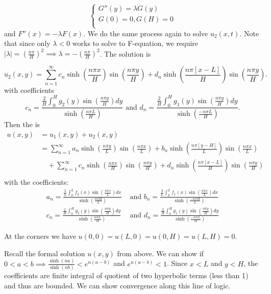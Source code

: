 \documentclass[class=article,crop=false]{standalone}
\begin{document}
\begin{equation*}
\begin{cases}
	G''(y) = \lambda G(y)\\
	G(0)=0, G(H)=0\\
\end{cases}
\end{equation*}
and  $F''(x)=-\lambda F(x)$. We do the same process again to solve $ u_2(x,t)$. Note that since only $ \lambda <0$ works to solve to F-equation, we require $ |\lambda|=\left( \frac{n\pi}{H } \right)^2 \implies \lambda = -\left(\frac{n\pi}{H } \right)^2$. The solution is

\[
	u_2(x,y)=\sum_{ n= 1}^{\infty} c_n \sinh\left(\frac{n\pi x}{H }  \right)
	\sin \left( \frac{ n\pi y}{ H} \right) + d_n \sinh\left(\frac{n\pi [x-L]}{H } \right) \sin \left( \frac{ n\pi y}{ H} \right) 
.\] 
with coefficients
\[
	c_n= \frac{\frac{2}{H} \int_0^H g_2(y) \sin \left( \frac{ n\pi y}{ H} \right) dy }{\sinh\left(\frac{n\pi L}{H } \right) } \text{ and } d_n =  \frac{\frac{2}{H} \int_0^H g_1(y) \sin \left( \frac{ n\pi y}{ H} \right) dy }{\sinh\left(\frac{-n\pi L}{H } \right) }
.\] 
Then the  is 
\begin{align*}
	u(x,y) &= u_1(x,y)+u_2(x,y) \\
	&= \sum_{ n= 1}^{\infty} a_n \sinh\left(\frac{n\pi y}{L }  \right) \sin \left( \frac{ n\pi x}{ L} \right) + b_n \sinh\left(\frac{n\pi [y-H]}{L } \right) \sin \left( \frac{ n\pi x}{ L} \right) \\
	&\quad + \sum_{ n= 1}^{\infty} c_n \sinh\left(\frac{n\pi x}{H }  \right) \sin \left( \frac{ n\pi y}{ H} \right) + d_n \sinh\left(\frac{n\pi [x-L]}{H } \right) \sin \left( \frac{ n\pi y}{ H} \right) \\
\end{align*}
with the coefficients:
\begin{align*}
	a_n= \frac{\frac{2}{L} \int_0^L f_2(x) \sin \left( \frac{ n\pi x}{ L} \right) dx }{\sinh\left(\frac{n\pi H}{L } \right) } &\text{ and } b_n =  \frac{\frac{2}{L} \int_0^L f_1(x) \sin \left( \frac{ n\pi x}{ L} \right) dx }{\sinh\left(\frac{-n\pi H}{L } \right) }\\
	c_n= \frac{\frac{2}{H} \int_0^H g_2(y) \sin \left( \frac{ n\pi y}{ H} \right) dy }{\sinh\left(\frac{n\pi L}{H } \right) } &\text{ and } d_n =  \frac{\frac{2}{H} \int_0^H g_1(y) \sin \left( \frac{ n\pi y}{ H} \right) dy }{\sinh\left(\frac{-n\pi L}{H } \right) }
\end{align*}
\begin{note}[]
	At the corners we have $ u(0,0)=u(L,0)=u(0,H)=u(L,H)=0$.
\end{note}
\begin{intuition}
Recall the formal solution $ u(x,y)$ from above. We can show if  $ 0<a<b \implies \frac{\sinh(na)}{\sinh(nb) }< e^{n(a-b)}$ and $ e^{n(a-b)}<1$. Since $ x<L$ and  $ y<H$, the coefficients are finite integral of quotient of two hyperbolic terms (less than 1) and thus are bounded. We can show convergence along this line of logic.
\end{intuition}
\end{document}
